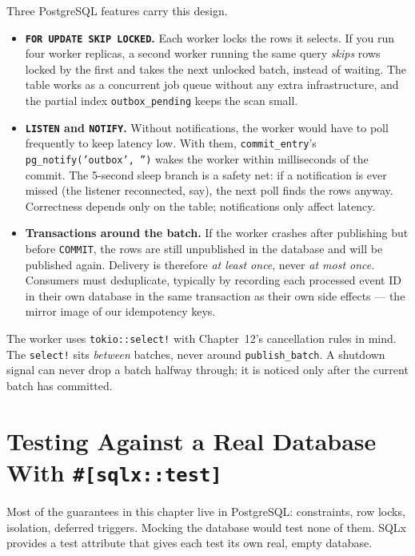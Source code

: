 Three PostgreSQL features carry this design.
\begin{itemize}
  \item \textbf{\texttt{FOR UPDATE SKIP LOCKED}.} Each worker locks the rows it selects. If you run four worker replicas, a second worker running the same query \emph{skips} rows locked by the first and takes the next unlocked batch, instead of waiting. The table works as a concurrent job queue without any extra infrastructure, and the partial index \texttt{outbox\_pending} keeps the scan small.
  \item \textbf{\texttt{LISTEN} and \texttt{NOTIFY}.} Without notifications, the worker would have to poll frequently to keep latency low. With them, \texttt{commit\_entry}'s \texttt{pg\_notify('outbox', '')} wakes the worker within milliseconds of the commit. The 5-second sleep branch is a safety net: if a notification is ever missed (the listener reconnected, say), the next poll finds the rows anyway. Correctness depends only on the table; notifications only affect latency.
  \item \textbf{Transactions around the batch.} If the worker crashes after publishing but before \texttt{COMMIT}, the rows are still unpublished in the database and will be published again. Delivery is therefore \emph{at least once}, never \emph{at most once}. Consumers must deduplicate, typically by recording each processed event ID in their own database in the same transaction as their own side effects --- the mirror image of our idempotency keys.
\end{itemize}

The worker uses \texttt{tokio::select!} with Chapter~12's cancellation rules in mind. The \texttt{select!} sits \emph{between} batches, never around \texttt{publish\_batch}. A shutdown signal can never drop a batch halfway through; it is noticed only after the current batch has committed.

\section{Testing Against a Real Database With \texttt{\#[sqlx::test]}}
\label{ch14:testing}

Most of the guarantees in this chapter live in PostgreSQL: constraints, row locks, isolation, deferred triggers. Mocking the database would test none of them. SQLx provides a test attribute that gives each test its own real, empty database.


